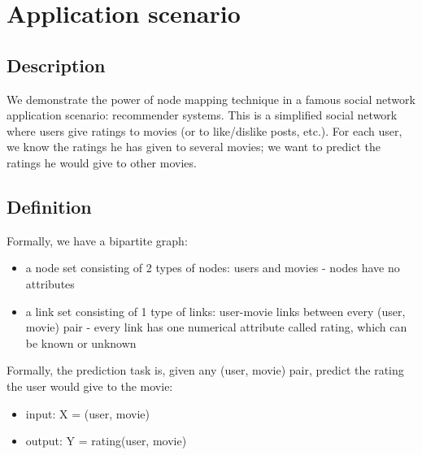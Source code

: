 \documentclass[twocolumn]{article}
\begin{document}
\section{Application scenario}

\subsection{Description}
We demonstrate the power of node mapping technique in a famous social network 
application scenario: recommender systems.
This is a simplified social network where users give ratings to movies (or to 
like/dislike posts, etc.).
For each user, we know the ratings he has given to several movies; we want to 
predict the ratings he would give to other movies.

\subsection{Definition}
Formally, we have a bipartite graph:
\begin{itemize}
	\item a node set consisting of 2 types of nodes: users and movies - nodes 
	have no attributes
	\item a link set consisting of 1 type of links: user-movie links between 
	every (user, movie) pair - every link has one numerical attribute called 
	rating, which can be known or unknown
\end{itemize}
Formally, the prediction task is, given any (user, movie) pair, predict the 
rating the user would give to the movie:
\begin{itemize}
	\item input: X = (user, movie)
	\item output: Y = rating(user, movie)
\end{itemize}
\end{document}
